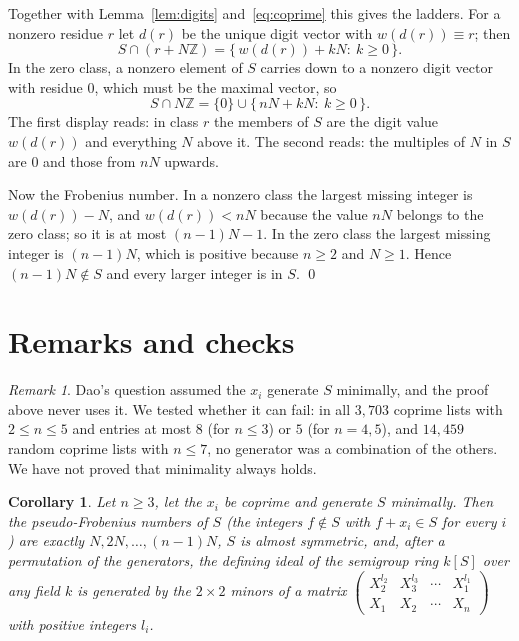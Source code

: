 \documentclass[11pt]{amsart}
\newtheorem{corollary}[theorem]{Corollary}
\theoremstyle{remark}
\newtheorem{remark}{Remark}
\begin{document}
Together with Lemma~\ref{lem:digits} and~\eqref{eq:coprime} this gives the ladders. For a nonzero residue $r$ let $d(r)$ be the unique digit vector with $w(d(r))\equiv r$; then
\[
S\cap(r+N\mathbb Z)=\{\,w(d(r))+kN:\ k\ge0\,\}.
\]
In the zero class, a nonzero element of $S$ carries down to a nonzero digit vector with residue $0$, which must be the maximal vector, so
\begin{equation}\label{eq:zero}
S\cap N\mathbb Z=\{0\}\cup\{\,nN+kN:\ k\ge0\,\}.
\end{equation}
The first display reads: in class $r$ the members of $S$ are the digit value $w(d(r))$ and everything $N$ above it. The second reads: the multiples of $N$ in $S$ are $0$ and those from $nN$ upwards.

Now the Frobenius number. In a nonzero class the largest missing integer is $w(d(r))-N$, and $w(d(r))<nN$ because the value $nN$ belongs to the zero class; so it is at most $(n-1)N-1$. In the zero class the largest missing integer is $(n-1)N$, which is positive because $n\ge2$ and $N\ge1$. Hence $(n-1)N\notin S$ and every larger integer is in $S$. \qed

\section{Remarks and checks}

\begin{remark}\label{rem:minimal}
Dao's question assumed the $x_i$ generate $S$ minimally, and the proof above never uses it. We tested whether it can fail: in all $3{,}703$ coprime lists with $2\le n\le5$ and entries at most $8$ (for $n\le3$) or $5$ (for $n=4,5$), and $14{,}459$ random coprime lists with $n\le7$, no generator was a combination of the others. We have not proved that minimality always holds.
\end{remark}

\begin{corollary}\label{cor:pf}
Let $n\ge3$, let the $x_i$ be coprime and generate $S$ minimally. Then the pseudo-Frobenius numbers of $S$ (the integers $f\notin S$ with $f+x_i\in S$ for every $i$) are exactly $N,2N,\dots,(n-1)N$, $S$ is almost symmetric, and, after a permutation of the generators, the defining ideal of the semigroup ring $k[S]$ over any field $k$ is generated by the $2\times2$ minors of a matrix $\begin{pmatrix} X_2^{l_2}&X_3^{l_3}&\cdots&X_1^{l_1}\\ X_1&X_2&\cdots&X_n\end{pmatrix}$ with positive integers $l_i$.
\end{corollary}
\end{document}
